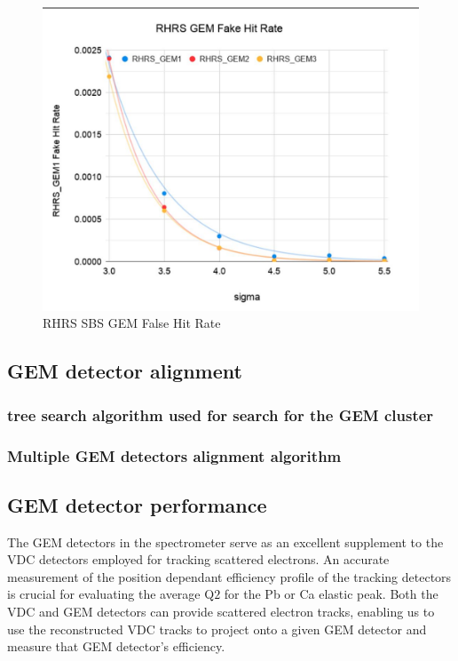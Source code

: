 \begin{figure}[!htbp]
    \centering
    \includegraphics[width=\textwidth]{images/chap5/rhrs_fake_hit_rate.png}
    \caption{RHRS SBS GEM False Hit Rate}
    \label{fig:rhrs_fake_hit_rate}
\end{figure}

\subsection{GEM detector alignment}

\subsubsection{tree search algorithm used for search for the GEM cluster}
\subsubsection{Multiple GEM detectors alignment algorithm }
\subsection{GEM detector performance}

The GEM detectors in the spectrometer serve as an excellent supplement to the VDC detectors employed for tracking scattered electrons. An accurate measurement of the position dependant efficiency profile of the tracking detectors is crucial for evaluating the average Q$2$ for the Pb or Ca elastic peak.  Both the VDC and GEM detectors can provide scattered electron tracks, enabling us to use the reconstructed VDC tracks  to project onto a given GEM detector and measure that  GEM detector's efficiency.

